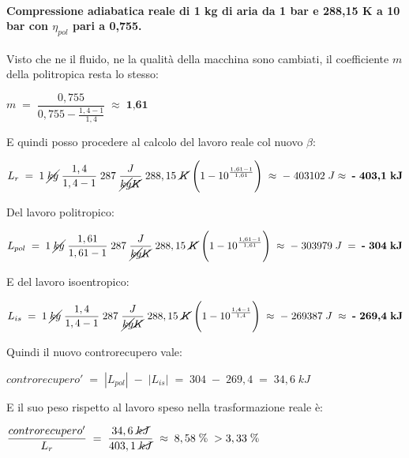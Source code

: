 \documentclass[a4paper, twoside, 12pt]{report}
\begin{document}
\paragraph{Compressione adiabatica reale di 1 kg di aria da 1 bar e 288,15 K a 10 bar con $\eta_{pol}$ pari a 0,755.\\}
Visto che ne il fluido, ne la qualità della macchina sono cambiati, il coefficiente $m$ della politropica resta lo stesso:
\begin{center}
	$m\;=\;\dfrac{0,755}{0,755-\frac{1,4-1}{1,4}}\;\approx\;\textbf{1,61}$
\end{center}
E quindi posso procedere al calcolo del lavoro reale col nuovo $\beta$:
\begin{center}
	$L_{r}\;=\;1\;\cancel{kg}\;\dfrac{1,4}{1,4-1}\;287\;\dfrac{J}{\cancel{kg}\cancel{K}}\;288,15\;\cancel{K}\;\Biggl(1-10^\frac{1,61-1}{1,61}\Biggr)\;\approx\;-\;403102\;J\approx\;\textbf{-\;403,1\;kJ}$
\end{center}
Del lavoro politropico:
\begin{center}
	$L_{pol}\;=\;1\;\cancel{kg}\;\dfrac{1,61}{1,61-1}\;287\;\dfrac{J}{\cancel{kg}\cancel{K}}\;288,15\;\cancel{K}\;\Biggl(1-10^\frac{1,61-1}{1,61}\Biggr)\;\approx\;-\;303979\;J\;=\;\textbf{-\;304\;kJ}$
\end{center}
E del lavoro isoentropico:
\begin{center}
	$L_{is}\;=\;1\;\cancel{kg}\;\dfrac{1,4}{1,4-1}\;287\;\dfrac{J}{\cancel{kg}\cancel{K}}\;288,15\;\cancel{K}\;\Biggl(1-10^\frac{1,4-1}{1,4}\Biggr)\;\approx\;-\;269387\;J\;\approx\;\textbf{-\;269,4\;kJ}$
\end{center}
Quindi il nuovo controrecupero vale:
\begin{center}
	$controrecupero'\;=\;|L_{pol}|\;-\;|L_{is}|\;=\;304\;-\;269,4\;=\;34,6\;kJ$
\end{center}
E il suo peso rispetto al lavoro speso nella trasformazione reale è:
\begin{center}
	$\dfrac{controrecupero'}{L_{r}}\;=\;\dfrac{34,6\;\cancel{kJ}}{403,1\;\cancel{kJ}}\;\approx\;8,58\;\%\;>3,33\;\%$
\end{center}
\end{document}
